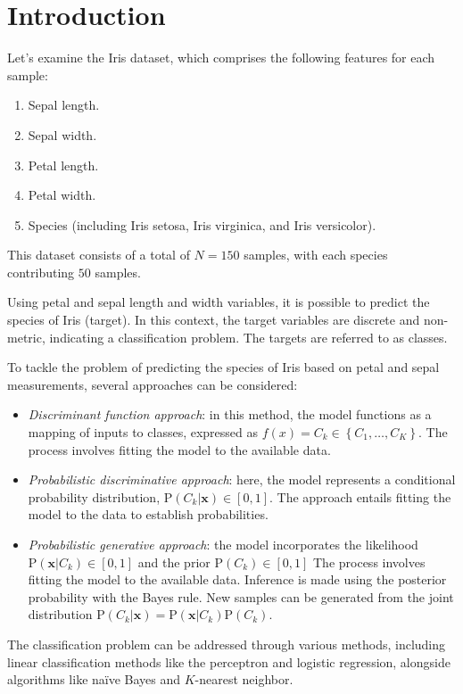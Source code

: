 \section{Introduction}

Let's examine the Iris dataset, which comprises the following features for each sample:
\begin{enumerate}
    \item Sepal length.
    \item Sepal width.
    \item Petal length.
    \item Petal width.
    \item Species (including Iris setosa, Iris virginica, and Iris versicolor).
\end{enumerate}
This dataset consists of a total of $N = 150$ samples, with each species contributing $50$ samples.

Using petal and sepal length and width variables, it is possible to predict the species of Iris (target).
In this context, the target variables are discrete and non-metric, indicating a classification problem.
The targets are referred to as classes.

To tackle the problem of predicting the species of Iris based on petal and sepal measurements, several approaches can be considered:
\begin{itemize}
    \item \textit{Discriminant function approach}: in this method, the model functions as a mapping of inputs to classes, expressed as $f(x)=C_k\in\left\{C_1,\dots,C_K\right\}$. 
        The process involves fitting the model to the available data.
    \item \textit{Probabilistic discriminative approach}: here, the model represents a conditional probability distribution, $\text{P}(C_k|\textbf{x})\in[0,1]$. 
        The approach entails fitting the model to the data to establish probabilities.
    \item \textit{Probabilistic generative approach}: the model incorporates the likelihood $\text{P}(\textbf{x}|C_k)\in[0,1]$ and the prior  $\text{P}(C_k)\in[0,1]$
        The process involves fitting the model to the available data.
        Inference is made using the posterior probability with the Bayes rule.
        New samples can be generated from the joint distribution $\text{P}(C_k|\textbf{x})=\text{P}(\textbf{x}|C_k)\text{P}(C_k)$.
\end{itemize}
The classification problem can be addressed through various methods, including linear classification methods like the perceptron and logistic regression, alongside algorithms like naïve Bayes and $K$-nearest neighbor.

